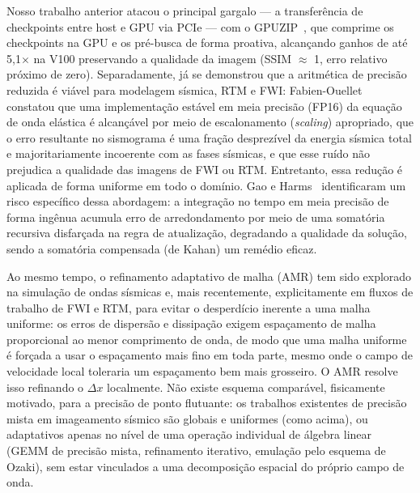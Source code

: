 \documentclass[12pt,a4paper]{article}
\begin{document}
Nosso trabalho anterior atacou o principal gargalo --- a transferência de
checkpoints entre host e GPU via PCIe --- com o
GPUZIP~\cite{maltempi2025checkpointing,gpuzip}, que comprime os checkpoints na
GPU e os pré-busca de forma proativa, alcançando ganhos de até 5,1$\times$ na
V100 preservando a qualidade da imagem (SSIM $\approx$ 1, erro relativo
próximo de zero). Separadamente, já se demonstrou que a aritmética de precisão
reduzida é viável para modelagem sísmica, RTM e FWI:
Fabien-Ouellet~\cite{fabienouellet2020half} constatou que uma implementação
estável em meia precisão (FP16) da equação de onda elástica é alcançável por
meio de escalonamento (\emph{scaling}) apropriado, que o erro resultante no
sismograma é uma fração desprezível da energia sísmica total e majoritariamente
incoerente com as fases sísmicas, e que esse ruído não prejudica a qualidade
das imagens de FWI ou RTM. Entretanto, essa redução é aplicada de forma
uniforme em todo o domínio. Gao e Harms~\cite{gao2023half} identificaram um
risco específico dessa abordagem: a integração no tempo em meia precisão de
forma ingênua acumula erro de arredondamento por meio de uma somatória
recursiva disfarçada na regra de atualização, degradando a qualidade da
solução, sendo a somatória compensada (de Kahan) um remédio eficaz.

Ao mesmo tempo, o refinamento adaptativo de malha (AMR) tem sido explorado na
simulação de ondas sísmicas e, mais recentemente, explicitamente em fluxos de
trabalho de FWI e RTM, para evitar o desperdício inerente a uma malha
uniforme: os erros de dispersão e dissipação exigem espaçamento de malha
proporcional ao menor comprimento de onda, de modo que uma malha uniforme é
forçada a usar o espaçamento mais fino em toda parte, mesmo onde o campo de
velocidade local toleraria um espaçamento bem mais grosseiro. O AMR resolve
isso refinando o $\Delta x$ localmente. Não existe esquema comparável,
fisicamente motivado, para a precisão de ponto flutuante: os trabalhos
existentes de precisão mista em imageamento sísmico são globais e uniformes
(como acima), ou adaptativos apenas no nível de uma operação individual de
álgebra linear (GEMM de precisão mista, refinamento iterativo, emulação pelo
esquema de Ozaki), sem estar vinculados a uma decomposição espacial do próprio
campo de onda.
\end{document}
